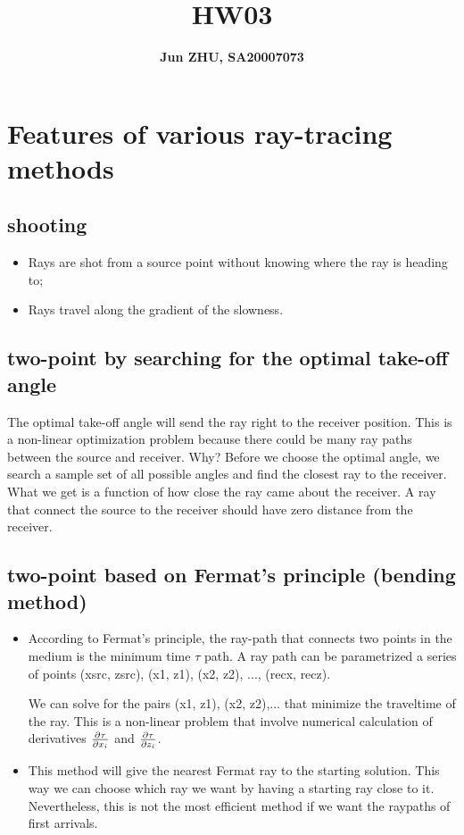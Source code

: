 \documentclass{article}
\title{\textbf{HW03}}
\author{\textbf{Jun ZHU, SA20007073}}
\begin{document}
\maketitle
\section{Features of various ray-tracing methods}

\subsection{shooting}
\begin{itemize}
\item Rays are shot from a source point without knowing where the ray is heading to;
\item Rays travel along the gradient of the slowness.
\end{itemize}

\subsection{two-point by searching for the optimal take-off angle}
The optimal take-off angle will send the ray right to the receiver position.
This is a non-linear optimization problem because there could be many
ray paths between the source and receiver. Why? Before we choose the
optimal angle, we search a sample set of all possible angles and find the
closest ray to the receiver. What we get is a function of how close the
ray came about the receiver. A ray that connect the source to the 
receiver should have zero distance from the receiver. 

\subsection{two-point based on Fermat's principle (bending method)}
\begin{itemize}
\item  According to Fermat's principle, the ray-path that connects two points
in the medium is the minimum time $\tau $ path. A ray path can be
parametrized a series of points {(xsrc, zsrc), (x1, z1), (x2, z2), ...,
(recx, recz)}. 

We can solve for the pairs  (x1, z1), (x2, z2),... that minimize the
traveltime of the ray. This is a non-linear problem that involve numerical
calculation of derivatives $ {\partial \tau \over \partial x_i} $ and $ {\partial \tau \over \partial z_i} $.
\item This method will give the nearest Fermat ray to the starting solution. This way we can choose which ray we want by having a starting ray close to it. Nevertheless, this is not the most efficient method if we
want the raypaths of first arrivals. 
\end{itemize}
\end{document}

